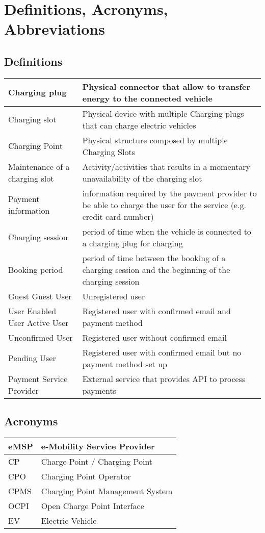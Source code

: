 \section{Definitions, Acronyms, Abbreviations}

\subsection{Definitions}

\begin{tabular}{|p{5cm}|p{10cm}|}
	\hline
	Charging plug & Physical connector that allow to transfer energy to the connected vehicle\\
	\hline
	Charging slot & Physical device with multiple Charging plugs that can charge electric vehicles\\
	\hline
	Charging Point & Physical structure composed by multiple Charging Slots\\
	\hline
	Maintenance of a charging slot & Activity/activities that results in a momentary unavailability of the charging slot\\
	\hline
	Payment information & information required by the payment provider to be able to charge the user for the service (e.g. credit card number)\\
	\hline
	Charging session & period of time when the vehicle is connected to a charging plug for charging\\
	\hline
	Booking period & period of time between the booking of a charging session and the beginning of the charging session\\
	\hline
	{Guest \newline Guest User} & Unregistered user\\
	\hline
	{User \newline Enabled User \newline Active User} & Registered user with confirmed email and payment method\\
	\hline
	Unconfirmed User & Registered user without confirmed email\\
	\hline
	Pending User & Registered user with confirmed email but no payment method set up\\
	\hline
	Payment Service Provider & External service that provides API to process payments\\
	\hline
\end{tabular}

\subsection{Acronyms}
\begin{tabular}{|l|l|}
	\hline
	eMSP & e-Mobility Service Provider\\
	\hline
	CP & Charge Point / Charging Point\\
	\hline
	CPO & Charging Point Operator\\
	\hline
	CPMS & Charging Point Management System\\
	\hline
	OCPI & Open Charge Point Interface\\
	\hline
	EV & Electric Vehicle\\
	\hline
\end{tabular}

